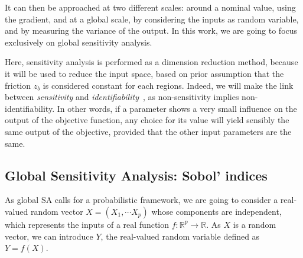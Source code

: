 \documentclass[../../Main_ManuscritThese.tex]{subfiles}
\newcommand{\zob}{z_b}
\begin{document}
It can then be approached at two different scales:
around a nominal value, using the gradient, and at a global scale, by
considering the inputs as random variable, and by measuring the
variance of the output. In this work, we are going to focus
exclusively on global sensitivity analysis.

Here, sensitivity analysis is performed as a dimension reduction
method, because it will be used to reduce the input space, based on
prior assumption that the friction $\zob$ is considered constant for
each regions. Indeed, we will make the link between \emph{sensitivity}
and \emph{identifiability}~\cite{dobre_global_2010}, as
non-sensitivity implies non-identifiability. In other words, if a
parameter shows a very small influence on the output of the objective
function, any choice for its value will yield sensibly the same output
of the objective, provided that the other input parameters are the
same.



\subsection{Global Sensitivity Analysis: Sobol' indices}
\label{sec:sobol-indices}
As global SA calls for a probabilistic framework, we are going to
consider a real-valued random vector $X=(X_1,\cdots X_p)$ whose
components are independent, which represents the inputs of a real
function $f: \mathbb{R}^p\rightarrow \mathbb{R}$. As $X$ is a random
vector, we can introduce $Y$, the real-valued random variable defined
as $Y=f(X)$.
\end{document}
